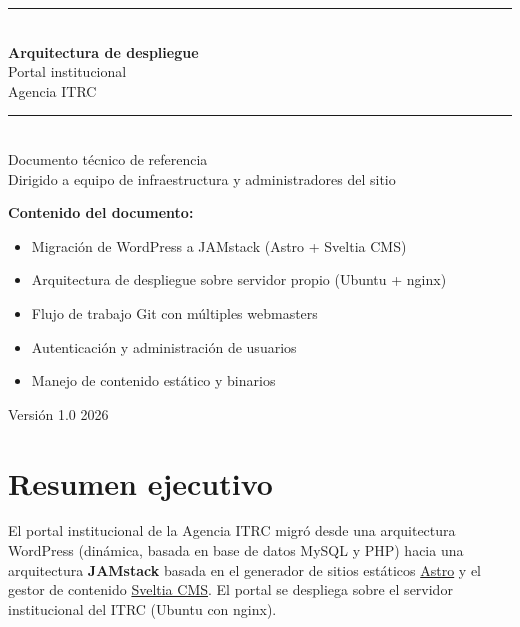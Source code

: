 \documentclass[11pt,a4paper]{article}
\begin{document}
\begin{titlepage}
  \centering
  \vspace*{2cm}
  {\color{itrcGold}\rule{\linewidth}{2pt}}\\[0.4cm]
  {\Huge\bfseries\color{itrcNavy} Arquitectura de despliegue\\[0.3cm]}
  {\LARGE\color{itrcNavy} Portal institucional}\\[0.3cm]
  {\Large\color{itrcNavy} Agencia ITRC}\\[0.3cm]
  {\color{itrcGold}\rule{\linewidth}{2pt}}\\[1.5cm]

  {\large Documento técnico de referencia}\\[0.3cm]
  {\small Dirigido a equipo de infraestructura y administradores del sitio}\\[3cm]

  \begin{tcolorbox}[
    colback=softGray,
    colframe=itrcNavy,
    boxrule=1pt,
    width=0.75\linewidth,
    arc=3pt
  ]
  \textbf{Contenido del documento:}
  \begin{itemize}[leftmargin=*, noitemsep, topsep=2pt]
    \item Migración de WordPress a JAMstack (Astro + Sveltia CMS)
    \item Arquitectura de despliegue sobre servidor propio (Ubuntu + nginx)
    \item Flujo de trabajo Git con múltiples webmasters
    \item Autenticación y administración de usuarios
    \item Manejo de contenido estático y binarios
  \end{itemize}
  \end{tcolorbox}

  \vfill
  {\small\color{midGray} Versión 1.0 \textbar{} 2026}
\end{titlepage}

\tableofcontents
\newpage

\section{Resumen ejecutivo}

El portal institucional de la Agencia ITRC migró desde una arquitectura WordPress (dinámica, basada en base de datos MySQL y PHP) hacia una arquitectura \textbf{JAMstack} basada en el generador de sitios estáticos \href{https://astro.build}{Astro} y el gestor de contenido \href{https://github.com/sveltia/sveltia-cms}{Sveltia CMS}. El portal se despliega sobre el servidor institucional del ITRC (Ubuntu con nginx).
\end{document}
